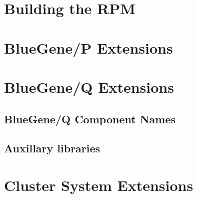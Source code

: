 \documentclass[10pt,letterpaper]{book}
\begin{document}
\appendix
\chapter {Building the RPM}
\chapter{BlueGene/P Extensions}
\chapter{BlueGene/Q Extensions}
\section{BlueGene/Q Component Names}
\section{Auxillary libraries}
\chapter{Cluster System Extensions}
\end{document}
